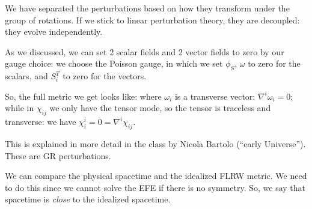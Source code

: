 \documentclass[main.tex]{subfiles}
\begin{document}
We have separated the perturbations based on how they transform under the group of rotations. 
If we stick to linear perturbation theory, they are decoupled: they evolve independently. 

As we discussed, we can set 2 scalar fields and 2 vector fields to zero by our gauge choice: we choose the Poisson gauge, in which we set \(\phi_{S}\), \(\omega \) to zero for the scalars, and \(S_{i}^{T}\) to zero for the vectors. 

So, the full metric we get looks like:
%
%
where \(\omega_{i}\) is a transverse vector: \(\nabla^{i} \omega_{i} = 0\); while in \(\chi_{ij}\) we only have the tensor mode, so the tensor is traceless and transverse: we have \(\chi^{i}_{i} = 0 = \nabla^{i} \chi_{ij} \). 


This is explained in more detail in the class by Nicola Bartolo (``early Universe''). These are GR perturbations. 

We can compare the physical spacetime and the idealized FLRW metric. 
We need to do this since we cannot solve the EFE if there is no symmetry. 
So, we say that spacetime is \emph{close} to the idealized spacetime. 


\end{document}
